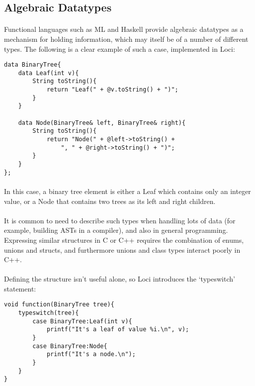 \documentclass[12pt,twoside,notitlepage]{report}
\begin{document}
\subsection{Algebraic Datatypes}

\paragraph{}
Functional languages such as ML and Haskell provide algebraic datatypes as a mechanism for holding information, which may itself be of a number of different types. The following is a clear example of such a case, implemented in Loci:

\small{
\begin{verbatim}
data BinaryTree{
    data Leaf(int v){
        String toString(){
            return "Leaf(" + @v.toString() + ")";
        }
    }
    
    data Node(BinaryTree& left, BinaryTree& right){
        String toString(){
            return "Node(" + @left->toString() +
                ", " + @right->toString() + ")";
        }
    }
};
\end{verbatim}
}

\paragraph{}
In this case, a binary tree element is either a Leaf which contains only an integer value, or a Node that contains two trees as its left and right children.

\paragraph{}
It is common to need to describe such types when handling lots of data (for example, building ASTs in a compiler), and also in general programming. Expressing similar structures in C or C++ requires the combination of enums, unions and structs, and furthermore unions and class types interact poorly in C++.

\paragraph{}
Defining the structure isn't useful alone, so Loci introduces the `typeswitch' statement:

\small{
\begin{verbatim}
void function(BinaryTree tree){
    typeswitch(tree){
        case BinaryTree:Leaf(int v){
            printf("It's a leaf of value %i.\n", v);
        }
        case BinaryTree:Node{
            printf("It's a node.\n");
        }
    }
}
\end{verbatim}
}
\end{document}
